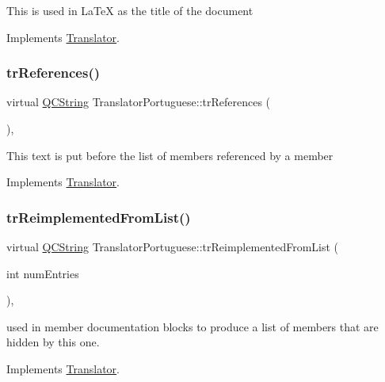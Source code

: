 This is used in La\+TeX as the title of the document 

Implements \mbox{\hyperlink{class_translator}{Translator}}.

\mbox{\label{class_translator_portuguese_a17f6aa45e113272eda6e36c01ee99a7c}} 
\subsubsection{\texorpdfstring{trReferences()}{trReferences()}}
{\footnotesize\ttfamily virtual \mbox{\hyperlink{class_q_c_string}{Q\+C\+String}} Translator\+Portuguese\+::tr\+References (\begin{DoxyParamCaption}{ }\end{DoxyParamCaption})\hspace{0.3cm}{\ttfamily [inline]}, {\ttfamily [virtual]}}

This text is put before the list of members referenced by a member 

Implements \mbox{\hyperlink{class_translator}{Translator}}.

\mbox{\label{class_translator_portuguese_ac1cc35e342cd1c3e9b97816cb5458917}} 
\subsubsection{\texorpdfstring{trReimplementedFromList()}{trReimplementedFromList()}}
{\footnotesize\ttfamily virtual \mbox{\hyperlink{class_q_c_string}{Q\+C\+String}} Translator\+Portuguese\+::tr\+Reimplemented\+From\+List (\begin{DoxyParamCaption}\item[{int}]{num\+Entries }\end{DoxyParamCaption})\hspace{0.3cm}{\ttfamily [inline]}, {\ttfamily [virtual]}}

used in member documentation blocks to produce a list of members that are hidden by this one. 

Implements \mbox{\hyperlink{class_translator}{Translator}}.

